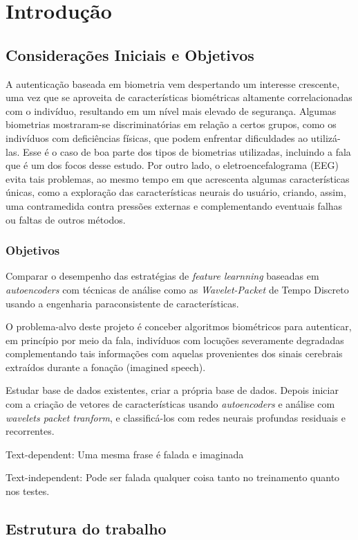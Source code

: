 \chapter{Introdução}
	\section{Considerações Iniciais e Objetivos}
	
		\par A autenticação baseada em biometria vem despertando um interesse crescente, uma vez que se aproveita de características biométricas altamente correlacionadas com o indivíduo, resultando em um nível mais elevado de segurança. Algumas biometrias mostraram-se discriminatórias em relação a certos grupos, como os indivíduos com deficiências físicas, que podem enfrentar dificuldades ao utilizá-las. Esse é o caso de boa parte dos tipos de biometrias utilizadas, incluindo a fala que é um dos focos desse estudo. Por outro lado, o eletroencefalograma (EEG) evita tais problemas, ao mesmo tempo em que acrescenta algumas características únicas, como a exploração das características neurais do usuário, criando, assim, uma contramedida contra pressões externas e complementando eventuais falhas ou faltas de outros métodos.
	
		\subsection{Objetivos}
			\par Comparar o desempenho das estratégias de \textit{feature learnning} baseadas em \textit{autoencoders} com técnicas de análise como as \textit{Wavelet-Packet} de Tempo Discreto usando a engenharia paraconsistente de características.
			\par O problema-alvo deste projeto é conceber algoritmos biométricos para autenticar, em princípio por meio da fala,  indivíduos com locuções severamente degradadas complementando tais informações com aquelas provenientes dos sinais cerebrais extraídos durante a fonação (imagined speech).
			\par Estudar base de dados existentes, criar a própria base de dados. Depois iniciar com a criação de vetores de características usando \textit{autoencoders} e análise com \textit{wavelets packet tranform}, e classificá-los com redes neurais profundas residuais e recorrentes.
			\par Text-dependent: Uma mesma frase é falada e imaginada
			\par Text-independent: Pode ser falada qualquer coisa tanto no treinamento quanto nos testes.
	\section{Estrutura do trabalho}
